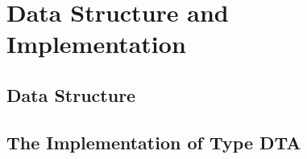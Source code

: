 \chapter{Data Structure and Implementation}



\section*{Data Structure}
\section*{The Implementation of Type DTA}

